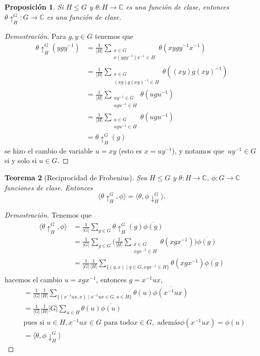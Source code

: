 \documentclass[12pt]{book}
\newtheorem{theorem}{Teorema}[section]
\newtheorem{proposition}[theorem]{Proposición}
\theoremstyle{definition}
\newcounter{in}
\begin{document}
\begin{proposition}
  Si $H\leq G$ y $\theta:H\rightarrow \mathbb{C}$ es una función de
  clase, entonces $\theta\uparrow^{G}_{H}:G\rightarrow \mathbb{C}$ es
  una función de clase. 
\end{proposition}
\begin{proof}[Demostración]
  Para $g,y\in G$ tenemos que
  \begin{align*}
    \theta\uparrow^{G}_{H}(ygy^{-1})&=\frac{1}{|H|}\sum_{\substack{x\in
        G\\x(ygy^{-1})x^{-1}\in H}}\theta(xygy^{-1}x^{-1})\\
    &=\frac{1}{|H|}\sum_{\substack{x\in
        G\\(xy)g(xy)^{-1}\in H}}\theta((xy)g(xy)^{-1})\\
    &=\frac{1}{|H|}\sum_{\substack{uy^{-1}\in
        G\\ugu^{-1}\in H}}\theta(ugu^{-1})\\
     &=\frac{1}{|H|}\sum_{\substack{u\in
        G\\ugu^{-1}\in H}}\theta(ugu^{-1})\\
    &=\theta\uparrow^{G}_{H}(g)
  \end{align*}
se hizo el cambio de variable $u=xy$ (esto es $x=uy^{-1}$), y notamos
que~$uy^{-1}\in G$ si y solo si $u\in G$.
\end{proof}
\begin{theorem}[Reciprocidad de Frobenius]
  \label{frobenius}
  Sea $H\leq G$ y $\theta:H\rightarrow\mathbb{C}$,
  $\phi:G\rightarrow \mathbb{C}$ funciones de
  clase. Entonces
  \begin{equation*}
    \langle\theta\uparrow^{G}_{H},\phi\rangle=\langle\theta,\phi\downarrow^{G}_{H}\rangle.
  \end{equation*}
\end{theorem}
\begin{proof}[Demostración]
  Tenemos que 
  \begin{align*}
    \langle\theta\uparrow^{G}_{H},\phi\rangle&=\frac{1}{|G|}\sum_{g\in
    G}\theta\uparrow^{G}_{H}(g)\overline{\phi(g)}\\
  &=\frac{1}{|G|}\sum_{g\in G}\Bigg(\frac{1}{|H|}\sum_{\substack{x\in
        G\\xgx^{-1}\in H}}\theta(xgx^{-1})\Bigg)\overline{\phi(g)}\\
    &=\frac{1}{|G|}\frac{1}{|H|}\sum_{\{(g,x)\mid g\in G,xgx^{-1}\in H\}}\theta(xgx^{-1})\overline{\phi(g)}\\
 \end{align*}
 hacemos el cambio $u=xgx^{-1}$, entonces $g=x^{-1}ux$,
\begin{align*}
  &=\frac{1}{|G|}\frac{1}{|H|}\sum_{\{(x^{-1}ux,x)\mid x^{-1}ux\in G,u\in H\}}\theta(u)\overline{\phi(x^{-1}ux)}\\
  &=\frac{1}{|G|}\frac{1}{|H|}|G|\sum_{u\in
    H}\theta(u)\overline{\phi(u)}\\
  &\text{pues si } u\in H, x^{-1}ux\in G \text{ para todo} x\in G,\text{ además} \phi(x^{-1}ux)=\phi(u)\\
   &=\langle\theta,\phi\downarrow^{G}_{H}\rangle
 \end{align*}
\end{proof}
\end{document}
